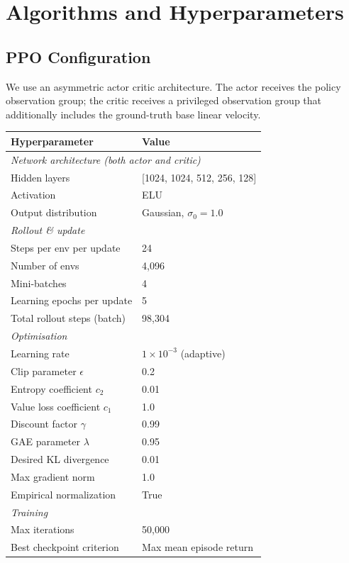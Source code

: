 \documentclass{article}
\begin{document}
\section{Algorithms and Hyperparameters}

\subsection{PPO Configuration}

We use an asymmetric actor critic architecture.
The actor receives the policy observation group; the critic receives a
privileged observation group that additionally includes the ground-truth base
linear velocity.

\begin{center}
\begin{tabular}{ll}
  \toprule
  \textbf{Hyperparameter} & \textbf{Value} \\
  \midrule
  \multicolumn{2}{l}{\textit{Network architecture (both actor and critic)}} \\
  \quad Hidden layers & [1024, 1024, 512, 256, 128] \\
  \quad Activation & ELU \\
  \quad Output distribution & Gaussian, $\sigma_0 = 1.0$ \\
  \midrule
  \multicolumn{2}{l}{\textit{Rollout \& update}} \\
  \quad Steps per env per update & 24 \\
  \quad Number of envs & 4{,}096 \\
  \quad Mini-batches & 4 \\
  \quad Learning epochs per update & 5 \\
  \quad Total rollout steps (batch) & 98{,}304 \\
  \midrule
  \multicolumn{2}{l}{\textit{Optimisation}} \\
  \quad Learning rate & $1\times10^{-3}$ (adaptive) \\
  \quad Clip parameter $\epsilon$ & 0.2 \\
  \quad Entropy coefficient $c_2$ & 0.01 \\
  \quad Value loss coefficient $c_1$ & 1.0 \\
  \quad Discount factor $\gamma$ & 0.99 \\
  \quad GAE parameter $\lambda$ & 0.95 \\
  \quad Desired KL divergence & 0.01 \\
  \quad Max gradient norm & 1.0 \\
  \quad Empirical normalization & True \\
  \midrule
  \multicolumn{2}{l}{\textit{Training}} \\
  \quad Max iterations & 50{,}000 \\
  \quad Best checkpoint criterion & Max mean episode return \\
  \bottomrule
\end{tabular}
\end{center}
\end{document}
